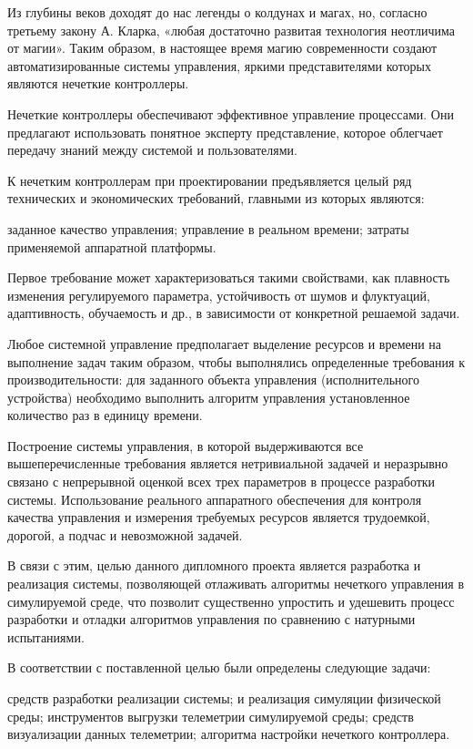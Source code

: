 \label{sec:intro}

Из глубины веков доходят до нас легенды о колдунах и магах, но, согласно третьему закону А. Кларка, «любая достаточно развитая технология неотличима от магии». Таким образом, в настоящее время магию современности создают автоматизированные системы управления, яркими представителями которых являются нечеткие контроллеры.

Нечеткие контроллеры обеспечивают эффективное управление процессами. Они предлагают использовать понятное эксперту представление, которое облегчает передачу знаний между системой и пользователями.

К нечетким контроллерам при проектировании предъявляется целый ряд технических и экономических требований, главными из которых являются:

\begin{itemize}
   заданное качество управления;
   управление в реальном времени; 
   затраты применяемой аппаратной платформы.
\end{itemize}

Первое требование может характеризоваться такими свойствами, как плавность изменения регулируемого параметра, устойчивость от шумов и флуктуаций, адаптивность, обучаемость и др., в зависимости от конкретной решаемой задачи.

Любое системной управление предполагает выделение ресурсов и времени на выполнение задач таким образом, чтобы выполнялись определенные требования к производительности: для заданного объекта управления (исполнительного устройства) необходимо выполнить алгоритм управления установленное количество раз в единицу времени. 

Построение системы управления, в которой выдерживаются все вышеперечисленные требования является нетривиальной задачей и неразрывно связано с непрерывной оценкой всех трех параметров в процессе разработки системы. Использование реального аппаратного обеспечения для контроля качества управления и измерения требуемых ресурсов является трудоемкой, дорогой, а подчас и невозможной задачей.

В связи с этим, целью данного дипломного проекта является разработка и реализация системы, позволяющей отлаживать алгоритмы нечеткого управления в симулируемой среде, что позволит существенно упростить и удешевить процесс разработки и отладки алгоритмов управления по сравнению с натурными испытаниями.	

В соответствии с поставленной целью были определены следующие задачи:

\begin{itemize}
   средств разработки реализации системы;
   и реализация симуляции физической среды;
   инструментов выгрузки телеметрии симулируемой среды;
   средств визуализации данных телеметрии;
   алгоритма настройки нечеткого контроллера.
\end{itemize}